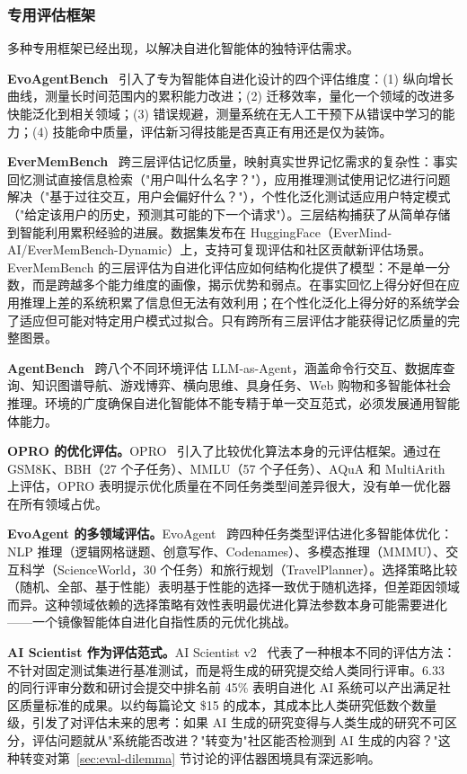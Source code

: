 \subsubsection{专用评估框架}

多种专用框架已经出现，以解决自进化智能体的独特评估需求。

\textbf{EvoAgentBench}~\citep{everos2025} 引入了专为智能体自进化设计的四个评估维度：(1) 纵向增长曲线，测量长时间范围内的累积能力改进；(2) 迁移效率，量化一个领域的改进多快能泛化到相关领域；(3) 错误规避，测量系统在无人工干预下从错误中学习的能力；(4) 技能命中质量，评估新习得技能是否真正有用还是仅为装饰。

\textbf{EverMemBench}~\citep{everos2025} 跨三层评估记忆质量，映射真实世界记忆需求的复杂性：事实回忆测试直接信息检索（"用户叫什么名字？"），应用推理测试使用记忆进行问题解决（"基于过往交互，用户会偏好什么？"），个性化泛化测试适应用户特定模式（"给定该用户的历史，预测其可能的下一个请求"）。三层结构捕获了从简单存储到智能利用累积经验的进展。数据集发布在 HuggingFace（EverMind-AI/EverMemBench-Dynamic）上，支持可复现评估和社区贡献新评估场景。EverMemBench 的三层评估为自进化评估应如何结构化提供了模型：不是单一分数，而是跨越多个能力维度的画像，揭示优势和弱点。在事实回忆上得分好但在应用推理上差的系统积累了信息但无法有效利用；在个性化泛化上得分好的系统学会了适应但可能对特定用户模式过拟合。只有跨所有三层评估才能获得记忆质量的完整图景。

\textbf{AgentBench}~\citep{agentbench2024} 跨八个不同环境评估 LLM-as-Agent，涵盖命令行交互、数据库查询、知识图谱导航、游戏博弈、横向思维、具身任务、Web 购物和多智能体社会推理。环境的广度确保自进化智能体不能专精于单一交互范式，必须发展通用智能体能力。

\textbf{OPRO 的优化评估。}OPRO~\citep{opro2023} 引入了比较优化算法本身的元评估框架。通过在 GSM8K、BBH（27 个子任务）、MMLU（57 个子任务）、AQuA 和 MultiArith 上评估，OPRO 表明提示优化质量在不同任务类型间差异很大，没有单一优化器在所有领域占优。

\textbf{EvoAgent 的多领域评估。}EvoAgent~\citep{evoagent2024} 跨四种任务类型评估进化多智能体优化：NLP 推理（逻辑网格谜题、创意写作、Codenames）、多模态推理（MMMU）、交互科学（ScienceWorld，30 个任务）和旅行规划（TravelPlanner）。选择策略比较（随机、全部、基于性能）表明基于性能的选择一致优于随机选择，但差距因领域而异。这种领域依赖的选择策略有效性表明最优进化算法参数本身可能需要进化——一个镜像智能体自进化自指性质的元优化挑战。

\textbf{AI Scientist 作为评估范式。}AI Scientist v2~\citep{aiscientist2024} 代表了一种根本不同的评估方法：不针对固定测试集进行基准测试，而是将生成的研究提交给人类同行评审。6.33 的同行评审分数和研讨会提交中排名前 45\% 表明自进化 AI 系统可以产出满足社区质量标准的成果。以约每篇论文 \$15 的成本，其成本比人类研究低数个数量级，引发了对评估未来的思考：如果 AI 生成的研究变得与人类生成的研究不可区分，评估问题就从"系统能否改进？"转变为"社区能否检测到 AI 生成的内容？"这种转变对第~\ref{sec:eval-dilemma} 节讨论的评估器困境具有深远影响。


